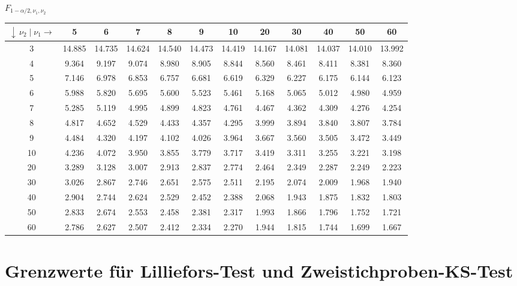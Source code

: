 \vspace{1mm}

$F_{1-\alpha/2,\nu_1, \nu_2}$

\vspace{1mm}
\begin{footnotesize}
\begin{tabular}{|c||c|c|c|c|c|c|c|c|c|c|c|}
\hline
 $\downarrow \, \nu_2 \; | \; \nu_1 \rightarrow$  & 5 & 6 & 7 & 8 & 9 & 10 & 20 & 30 & 40 & 50 & 60 \\
\hline\hline
3 & 14.885 & 14.735 & 14.624 & 14.540 & 14.473 & 14.419 & 14.167 & 14.081 & 14.037 & 14.010 & 13.992\\
\hline
4 & 9.364 & 9.197 & 9.074 & 8.980 & 8.905 & 8.844 & 8.560 & 8.461 & 8.411 & 8.381 & 8.360\\
\hline
 5 & 7.146 & 6.978 & 6.853 & 6.757 & 6.681 & 6.619 & 6.329 & 6.227 & 6.175 & 6.144 & 6.123 \\
\hline
 6 & 5.988 & 5.820 & 5.695 & 5.600 & 5.523 & 5.461 & 5.168 & 5.065 & 5.012 & 4.980 & 4.959 \\
\hline
 7 & 5.285 & 5.119 & 4.995 & 4.899 & 4.823 & 4.761 & 4.467 & 4.362 & 4.309 & 4.276 & 4.254 \\
\hline
 8 & 4.817 & 4.652 & 4.529 & 4.433 & 4.357 & 4.295 & 3.999 & 3.894 & 3.840 & 3.807 & 3.784 \\
\hline
 9 & 4.484 & 4.320 & 4.197 & 4.102 & 4.026 & 3.964 & 3.667 & 3.560 & 3.505 & 3.472 & 3.449 \\
\hline
 10 & 4.236 & 4.072 & 3.950 & 3.855 & 3.779 & 3.717 & 3.419 & 3.311 & 3.255 & 3.221 & 3.198 \\
\hline
 20 & 3.289 & 3.128 & 3.007 & 2.913 & 2.837 & 2.774 & 2.464 & 2.349 & 2.287 & 2.249 & 2.223 \\
\hline
 30 & 3.026 & 2.867 & 2.746 & 2.651 & 2.575 & 2.511 & 2.195 & 2.074 & 2.009 & 1.968 & 1.940 \\
\hline
 40 & 2.904 & 2.744 & 2.624 & 2.529 & 2.452 & 2.388 & 2.068 & 1.943 & 1.875 & 1.832 & 1.803 \\
\hline
 50 & 2.833 & 2.674 & 2.553 & 2.458 & 2.381 & 2.317 & 1.993 & 1.866 & 1.796 & 1.752 & 1.721 \\
\hline
 60 & 2.786 & 2.627 & 2.507 & 2.412 & 2.334 & 2.270 & 1.944 & 1.815 & 1.744 & 1.699 & 1.667 \\
\hline
\end{tabular}
\end{footnotesize}

\newpage

\section{Grenzwerte für Lilliefors-Test und Zweistichproben-KS-Test}

